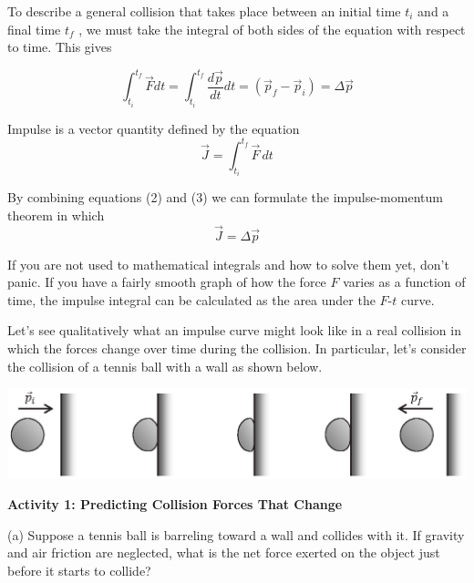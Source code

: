 To describe a general collision that takes place between an initial time $t_{i}$
and a final time $t_{f}$ , we must take the integral of both sides of the
equation with respect to time. This gives

\begin{equation}
\int _{t_{i}}^{t_{f}}{\vec  F}dt=\int _{t_{i}}^{t_{f}}\frac{d{\vec  p}}{dt}dt=\left( {{\vec  p}_{f}}-{{\vec  p}_{i}}\right) =\Delta {\vec  p}
\end{equation}

Impulse is a vector quantity defined by the equation
\begin{equation}
{\vec  J}=\int_{t_{i}}^{t_{f}}{\vec  F}\,dt
\end{equation}

By combining equations (2) and (3) we can formulate the impulse-momentum
theorem in which
\begin{equation}
{\vec  J}=\Delta {\vec  p}
\end{equation}

If you are not used to mathematical integrals and how to solve them yet, don't
panic. If you have a fairly smooth graph of how the force $F$ varies as a function
of time, the impulse integral can be calculated as the area under the $F$-$t$ 
curve.

Let's see qualitatively what an impulse curve might look like in a real collision
in which the forces change over time during the collision. In particular, let's
consider the collision of a tennis ball with a wall as shown below.

\vspace{0.3cm}
{\par\centering \includegraphics{impulse/ball_hitting_wall.eps} \par}
\vspace{0.3cm}

\textbf{Activity 1: Predicting Collision Forces That Change }

(a) Suppose a tennis ball is barreling toward a wall and collides with it. If gravity and air friction are neglected, what is the net force exerted on the object just before it starts to collide?
\vspace{10mm}

